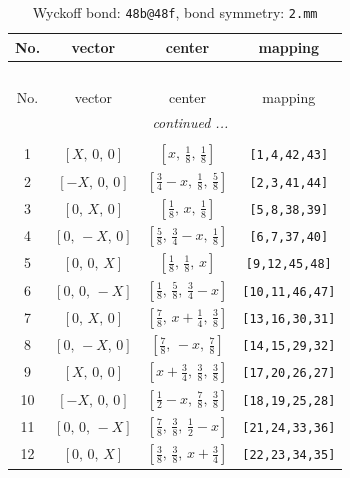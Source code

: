 \documentclass[fleqn,8pt]{jsarticle}
\begin{document}
\renewcommand{\arraystretch}{1.2}
\begin{longtable}{cccc}
\caption{Wyckoff bond: {\tt 48b@48f}, bond symmetry: {\tt 2.mm}}
 \\
 \hline \hline
No. & vector & center & mapping \\ \hline \endfirsthead

\multicolumn{3}{l}{\tablename\ \thetable{}} \\
 \hline \hline
No. & vector & center & mapping \\ \hline \endhead

 \hline \hline
\multicolumn{3}{r}{\footnotesize\it continued ...} \\ \endfoot

 \hline \hline
\multicolumn{3}{r}{} \\ \endlastfoot

1 & $\left[ X,\, 0,\, 0 \right]$ & $\left[ x,\, \frac{1}{8},\, \frac{1}{8} \right]$ & {\tt [1,4,42,43]} \\ \hline
2 & $\left[ - X,\, 0,\, 0 \right]$ & $\left[ \frac{3}{4} - x,\, \frac{1}{8},\, \frac{5}{8} \right]$ & {\tt [2,3,41,44]} \\ \hline
3 & $\left[ 0,\, X,\, 0 \right]$ & $\left[ \frac{1}{8},\, x,\, \frac{1}{8} \right]$ & {\tt [5,8,38,39]} \\ \hline
4 & $\left[ 0,\, - X,\, 0 \right]$ & $\left[ \frac{5}{8},\, \frac{3}{4} - x,\, \frac{1}{8} \right]$ & {\tt [6,7,37,40]} \\ \hline
5 & $\left[ 0,\, 0,\, X \right]$ & $\left[ \frac{1}{8},\, \frac{1}{8},\, x \right]$ & {\tt [9,12,45,48]} \\ \hline
6 & $\left[ 0,\, 0,\, - X \right]$ & $\left[ \frac{1}{8},\, \frac{5}{8},\, \frac{3}{4} - x \right]$ & {\tt [10,11,46,47]} \\ \hline
7 & $\left[ 0,\, X,\, 0 \right]$ & $\left[ \frac{7}{8},\, x + \frac{1}{4},\, \frac{3}{8} \right]$ & {\tt [13,16,30,31]} \\ \hline
8 & $\left[ 0,\, - X,\, 0 \right]$ & $\left[ \frac{7}{8},\, - x,\, \frac{7}{8} \right]$ & {\tt [14,15,29,32]} \\ \hline
9 & $\left[ X,\, 0,\, 0 \right]$ & $\left[ x + \frac{3}{4},\, \frac{3}{8},\, \frac{3}{8} \right]$ & {\tt [17,20,26,27]} \\ \hline
10 & $\left[ - X,\, 0,\, 0 \right]$ & $\left[ \frac{1}{2} - x,\, \frac{7}{8},\, \frac{3}{8} \right]$ & {\tt [18,19,25,28]} \\ \hline
11 & $\left[ 0,\, 0,\, - X \right]$ & $\left[ \frac{7}{8},\, \frac{3}{8},\, \frac{1}{2} - x \right]$ & {\tt [21,24,33,36]} \\ \hline
12 & $\left[ 0,\, 0,\, X \right]$ & $\left[ \frac{3}{8},\, \frac{3}{8},\, x + \frac{3}{4} \right]$ & {\tt [22,23,34,35]} \\
\end{longtable}
\end{document}
